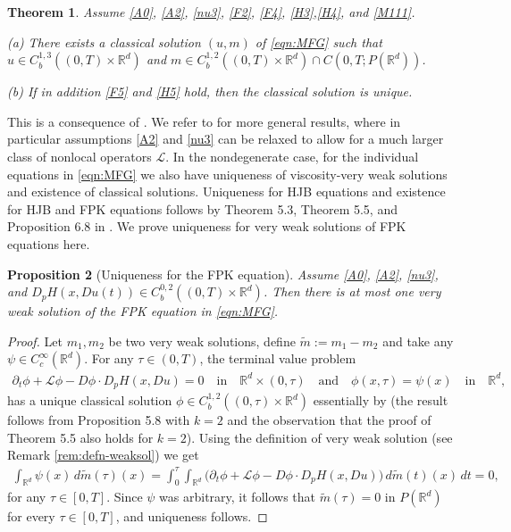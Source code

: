 \documentclass[a4paper,  twoside, 10pt, leqno]{amsart}
\newcommand{\R}{\mathbb{R}}
\newcommand{\rd}{\mathbb{R}^d}
\newtheorem{thm}{Theorem}[section]
\newtheorem{proposition}[thm]{Proposition}
\theoremstyle{remark}
\theoremstyle{definition}
\begin{document}
\begin{thm} \label{mfg:classical_solution}
     Assume \ref{A0}, \ref{A2}, \ref{nu3}, \ref{F2}, \ref{F4}, \ref{H3},\ref{H4}, and \ref{M111}.\smallskip
     
\noindent  (a) There exists a classical solution $ ( u,m )$ of \eqref{eqn:MFG} such that $u\in C^{1,3}_b((0,T)\times \R^d)$ and $m\in C^{1,2}_b((0,T)\times \R^d)\cap C(0,T; P(\R^d))$.
     
\medskip\noindent (b) If in addition \ref{F5} and \ref{H5} hold, then the classical solution is unique.
\end{thm}
This is a consequence of \cite[Theorem 2.5 and Theorem 2.6]{ersland2020classical}. We refer to \cite{ersland2020classical} for more general results, where in particular assumptions \ref{A2} and \ref{nu3} can be relaxed to allow for a much larger class of nonlocal operators $\mathcal L$.  In the nondegenerate case, for the individual equations in \eqref{eqn:MFG} we also have uniqueness of viscosity-very weak solutions and existence of classical solutions. Uniqueness for HJB equations and existence for HJB and FPK equations follows by Theorem 5.3, Theorem 5.5, and Proposition 6.8 in \cite{ersland2020classical}. We prove uniqueness for very weak solutions of FPK equations here.

\begin{proposition}[Uniqueness for the FPK equation] \label{uniqueness_weak_soln_fp}
Assume \ref{A0}, \ref{A2}, \ref{nu3}, and $D_p H (x,Du (t)) \in C_b^{0,2} ((0,T)\times\rd)$. Then there is
at most one very weak solution of the FPK equation in \eqref{eqn:MFG}. 
\end{proposition}


\begin{proof}
Let $m_1,m_2$ be two very weak solutions, define $\tilde m := m_1 - m_2$  
and take any $\psi \in C_c^{\infty} \left(  \rd \right)$.
For any $\tau \in (0,T)$, the terminal value problem  \begin{align*}
    \partial_t \phi + \mathcal{L} \phi - D \phi \cdot D_p H (x, Du)  = 0 \quad \text{in} \quad \R^d\times(0,\tau) \quad \text{and} \quad 
\phi (x,\tau) = \psi(x)\quad \text{in} \quad \R^d,
\end{align*}
has a unique classical solution $\phi \in C_b^{1,2} ( (0,\tau)\times \rd) $ essentially by \cite[Theorem 5.5]{ersland2020classical} (the result follows from Proposition 5.8 with $k=2$ and the observation that the proof of Theorem 5.5 also holds for $k=2$). Using the definition of very weak solution (see Remark \ref{rem:defn-weaksol}) we get 
\begin{align*}
     \int_{\rd} \psi(x) \, d\tilde m(\tau)(x) = 
    \int_0^\tau \int_{\rd} \big(\partial_t \phi + \mathcal{L} \phi -  D \phi \cdot D_p H (x,Du) \big) \, d\tilde m(t)(x) \, dt  
   = 0,
\end{align*}
for any $\tau \in [0,T]$. Since $\psi$ was arbitrary, it follows that $\tilde m (\tau) = 0$ in $P (\rd) $ for every $\tau \in [0,T]$, and uniqueness follows.
\end{proof}
\end{document}
